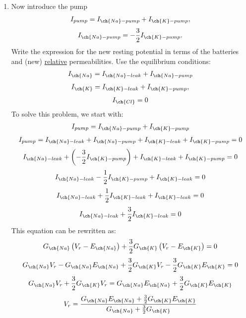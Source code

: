 \documentclass[11pt]{article}
\begin{document}
\begin{enumerate}[label=\arabic*.]
\begin{enumerate}[label=(\alph*)]
\newpage
\item
Now introduce the pump
\begin{align*}
I_{pump} = I_{\ch{Na}-pump} + I_{\ch{K}-pump},
\end{align*}
\begin{align*}
I_{\ch{Na}-pump} =  -\frac{3} {2} I_{\ch{K}-pump}.
\end{align*}
Write the expression for the new resting potential in terms of the batteries and (new) \underline{relative} permeabilities. Use the equilibrium conditions:
\begin{align*}
I_{\ch{Na}} = I_{\ch{Na}-leak} + I_{\ch{Na}-pump}
\end{align*}
\begin{align*}
I_{\ch{K}} = I_{\ch{K}-leak} + I_{\ch{K}-pump},
\end{align*}
\begin{align*}
I_{\ch{Cl}} = 0
\end{align*}
To solve this problem, we start with:
\begin{align*}
I_{pump} = I_{\ch{Na}-pump} + I_{\ch{K}-pump}
\end{align*}
\begin{align*}
I_{pump} = I_{\ch{Na}-leak} + I_{\ch{Na}-pump} + I_{\ch{K}-leak} + I_{\ch{K}-pump} = 0
\end{align*}
\begin{align*}
I_{\ch{Na}-leak} + \left(-\frac{3} {2} I_{\ch{K}-pump}\right) + I_{\ch{K}-leak} + I_{\ch{K}-pump} = 0
\end{align*}
\begin{align*}
I_{\ch{Na}-leak} - \frac{1} {2} I_{\ch{K}-pump} + I_{\ch{K}-leak} = 0
\end{align*}
\begin{align*}
I_{\ch{Na}-leak} + \frac{1} {2} I_{\ch{K}-leak} + I_{\ch{K}-leak} = 0
\end{align*}
\begin{align*}
I_{\ch{Na}-leak} + \frac{3} {2} I_{\ch{K}-leak} = 0
\end{align*}
This equation can be rewritten as:
\begin{align*}
G_{\ch{Na}} \left(V_r - E_{\ch{Na}}\right) + \frac{3} {2} G_{\ch{K}} \left(V_r - E_{\ch{K}}\right) = 0
\end{align*}
\begin{align*}
G_{\ch{Na}} V_r - G_{\ch{Na}} E_{\ch{Na}} + \frac{3} {2} G_{\ch{K}} V_r - \frac{3} {2} G_{\ch{K}} E_{\ch{K}} = 0
\end{align*}
\begin{align*}
G_{\ch{Na}} V_r + \frac{3} {2} G_{\ch{K}} V_r = G_{\ch{Na}} E_{\ch{Na}} + \frac{3} {2} G_{\ch{K}} E_{\ch{K}}
\end{align*}
\begin{align*}
V_r = \frac{G_{\ch{Na}} E_{\ch{Na}} + \frac{3} {2} G_{\ch{K}} E_{\ch{K}}} {G_{\ch{Na}} + \frac{3} {2} G_{\ch{K}}}
\end{align*}




\end{enumerate}
\end{enumerate}
\end{document}
